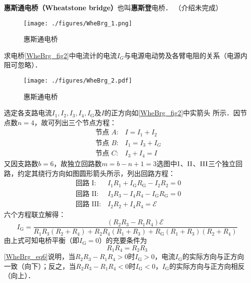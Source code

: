 

\textbf{惠斯通电桥（Wheatstone bridge）}也叫\textbf{惠斯登}电桥． （介绍未完成）

\begin{figure}[ht]
\centering
\texttt{[image: ./figures/WheBrg\_1.png]}
\caption{惠斯通电桥} \label{WheBrg_fig1}
\end{figure}

求电桥\autoref{WheBrg_fig2}中电流计的电流$I_G$与电源电动势及各臂电阻的关系（电源内阻可忽略）．
\begin{figure}[ht]
\centering
\texttt{[image: ./figures/WheBrg\_2.pdf]}
\caption{惠斯通电桥} \label{WheBrg_fig2}
\end{figure}

选定各支路电流$I_{1}, I_{2}, I_{3}, I_{4}, I_{\mathrm{G}}$及$I $的正方向如\autoref{WheBrg_fig2}中实箭头
所示．因节点数$n = 4$，故可列出三个节点方程：
\begin{equation}
\begin{array}{ll}\text { 节点 } A: & I=I_{1}+I_{2} \\ \text { 节点 } B: & I_{1}=I_{3}+I_{G} \\ \text { 节点 } C: & I_{3}+I_{4}=I\end{array}
\end{equation}
又因支路数$b=6$，故独立回路数$m=b-n+1=3$选图中$\rm I$、$\rm II$、$\rm III$三个独立回路，约定其绕行方向如图圆形箭头所示，列出回路方程：
\begin{equation}
\begin{array}{ll}\text { 回路 } \mathrm{I}: & I_{1} R_{1}+I_{\mathrm{G}} R_{\mathrm{G}}-I_{2} R_{2}=0 \\ \text { 回路 } \mathrm{II}: & I_{3} R_{3}-I_{4} R_{4}-I_{\mathrm{G}} R_{\mathrm{G}}=0 \\ \text { 回路 } \mathrm{III}  : & I_{2} R_{2}+I_{4} R_{4}=\mathscr{E}\end{array}
\end{equation}
六个方程联立解得：
\begin{equation} \label{WheBrg_eq6}
I_{\mathrm{G}}=\frac{\left(R_{2} R_{3}-R_{1} R_{4}\right) \mathscr{E}}{{R}_{1} R_{3}\left(R_{2}+R_{4}\right)+R_{2} R_{4}\left(R_{1}+R_{3}\right)+R_{\mathrm{G}}\left(R_{1}+R_{3}\right)\left(R_{2}+R_{4}\right)}
\end{equation}
由上式可知电桥平衡（即$I_\mathrm{G} = 0$）的充要条件为
\begin{equation}
R_{1} R_{4}=R_{2} R_{3}
\end{equation}
\autoref{WheBrg_eq6}说明，当$R_{2} R_{3}-R_{1} R_{4}>0$时$I_{\mathrm{G}}>0$，电流$I_{\mathrm{G}}$的实际方向与正方向一致（向下）；反之，当$R_{2} R_{3}-R_{1} R_{4}<0$时$I_{\mathrm{G}}<0$，$I_{\mathrm{G}}$的实际方向与正方向相反（向上）．
